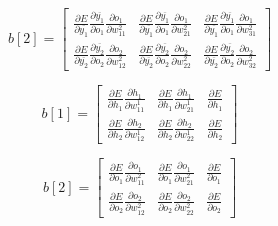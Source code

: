 \begin{equation*}
    b[2] = \begin{bmatrix}
       \frac{\partial E}{\partial \overline{y_1}} \frac{\partial \overline{y_1}}{\partial o_1} \frac{\partial o_1}{\partial w_{11}^2} &
       \frac{\partial E}{\partial \overline{y_1}} \frac{\partial \overline{y_1}}{\partial o_1} \frac{\partial o_1}{\partial w_{21}^2} &
       \frac{\partial E}{\partial \overline{y_1}} \frac{\partial \overline{y_1}}{\partial o_1} \frac{\partial o_1}{\partial w_{31}^2}
       \\[0.5cm]

       \frac{\partial E}{\partial \overline{y_2}} \frac{\partial \overline{y_2}}{\partial o_2} \frac{\partial o_2}{\partial w_{12}^2} &
       \frac{\partial E}{\partial \overline{y_2}} \frac{\partial \overline{y_2}}{\partial o_2} \frac{\partial o_2}{\partial w_{22}^2} &
       \frac{\partial E}{\partial \overline{y_2}} \frac{\partial \overline{y_2}}{\partial o_2} \frac{\partial o_2}{\partial w_{32}^2}
           \end{bmatrix}
\end{equation*}

\begin{equation*}
    b[1] = \begin{bmatrix}
       \frac{\partial E}{\partial h_1} \frac{\partial h_1}{\partial w_{11}^1} &
       \frac{\partial E}{\partial h_1} \frac{\partial h_1}{\partial w_{21}^1} &
       \frac{\partial E}{\partial h_1} 
       \\[0.5cm]

       \frac{\partial E}{\partial h_2} \frac{\partial h_2}{\partial w_{12}^1} &
       \frac{\partial E}{\partial h_2} \frac{\partial h_2}{\partial w_{22}^1} &
       \frac{\partial E}{\partial h_2} 
           \end{bmatrix}
\end{equation*}

\begin{equation*}
    b[2] = \begin{bmatrix}
       \frac{\partial E}{\partial o_1} \frac{\partial o_1}{\partial w_{11}^2} &
       \frac{\partial E}{\partial o_1} \frac{\partial o_1}{\partial w_{21}^2} &
       \frac{\partial E}{\partial o_1} 
       \\[0.5cm]

       \frac{\partial E}{\partial o_2} \frac{\partial o_2}{\partial w_{12}^2} &
       \frac{\partial E}{\partial o_2} \frac{\partial o_2}{\partial w_{22}^2} &
       \frac{\partial E}{\partial o_2}
           \end{bmatrix}
\end{equation*}
